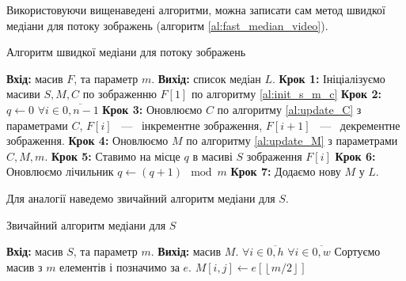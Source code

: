 Використовуючи вищенаведені алгоритми,
можна записати сам метод швидкої медіани для потоку зображень (алгоритм \ref{al:fast_median_video}).


\begin{algorithm}[H]
    \caption{Алгоритм швидкої медіани для потоку зображень}
    \begin{algorithmic}
        \State \textbf{Вхід:} масив $F$, та параметр $m$.
        \State \textbf{Вихід:} список медіан $L$.
        \State \textbf{Крок 1:} Ініціалізуємо масиви $S, M, C$ по зображенню $F[1]$ по алгоритму \ref{al:init_s_m_c}
        \State \textbf{Крок 2:} $q \gets 0$ 
        \State  $\forall i \in \overline{0,n-1}$
        \State \qquad \textbf{Крок 3:} Оновлюємо $C$ по алгоритму \ref{al:update_C} з параметрами $C$,
        $F[i]$ ~---~ інкрементне зображення, $F[i+1]$ ~---~ декрементне зображення.
        \State \qquad \textbf{Крок 4:} Оновлюємо $M$ по алгоритму \ref{al:update_M} з параметрами $C, M, m$.
        \State \qquad \textbf{Крок 5:} Ставимо на місце $q$ в масиві $S$ зображення $F[i]$
        \State \qquad \textbf{Крок 6:} Оновлюємо лічильник $q \gets (q+1) \mod m$
        \State \qquad \textbf{Крок 7:} Додаємо нову $M$ у $L$.
    \end{algorithmic}
    \label{al:fast_median_video}
\end{algorithm}

Для аналогії наведемо звичайний алгоритм медіани для $S$.
\begin{algorithm}[H]
    \caption{Звичайний алгоритм медіани для $S$}
    \begin{algorithmic}
        \State \textbf{Вхід:} масив $S$, та параметр $m$.
        \State \textbf{Вихід:} масив $M$.
        \State  $\forall i \in \overline{0,h}$
        \State \qquad  $\forall i \in \overline{0,w}$
        \State \qquad \qquad  Сортуємо масив з $m$ елементів і позначимо за $e$.
        \State \qquad \qquad  $M[i,j] \gets e[\left\lfloor m/2 \right\rfloor ]$ 
    \end{algorithmic}
\end{algorithm}

